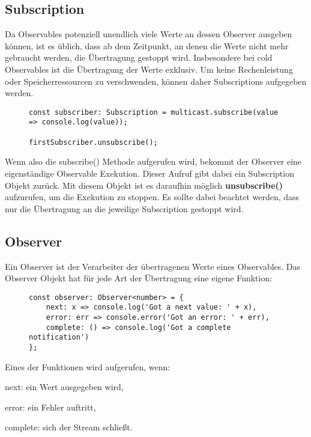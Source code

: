 \subsection{Subscription}

Da Observables potenziell unendlich viele Werte an dessen Observer ausgeben können, ist es üblich, dass ab dem Zeitpunkt, an denen die Werte nicht mehr gebraucht werden, die Übertragung gestoppt wird. Insbesondere bei cold Observables ist die Übertragung der Werte exklusiv. Um keine Rechenleistung oder Speicherressourcen zu verschwenden, können daher Subscriptions aufgegeben werden.

\begin{figure}[H]
\begin{lstlisting}[basicstyle=\small]
const subscriber: Subscription = multicast.subscribe(value => console.log(value));

firstSubscriber.unsubscribe();
\end{lstlisting}
\end{figure}

\noindent
Wenn also die subscribe() Methode aufgerufen wird, bekommt der Observer eine eigenständige Observable Exekution. Dieser Aufruf gibt dabei ein Subscription Objekt zurück. Mit diesem Objekt ist es daraufhin möglich \textbf{unsubscribe()} aufzurufen, um die Exekution zu stoppen. Es sollte dabei beachtet werden, dass nur die Übertragung an die jeweilige Subscription gestoppt wird.

\subsection{Observer}

Ein Observer ist der Verarbeiter der übertragenen Werte eines Observables. Das Observer Objekt hat für jede Art der Übertragung eine eigene Funktion:

\begin{figure}[H]
\begin{lstlisting}[basicstyle=\small]
const observer: Observer<number> = {
    next: x => console.log('Got a next value: ' + x),
    error: err => console.error('Got an error: ' + err),
    complete: () => console.log('Got a complete notification')
};
\end{lstlisting}
\end{figure}

\noindent
Eines der Funktionen wird aufgerufen, wenn:

\begin{description}
\item next: ein Wert ausgegeben wird,
\item error: ein Fehler auftritt,
\item complete: sich der Stream schließt.
\end{description}

